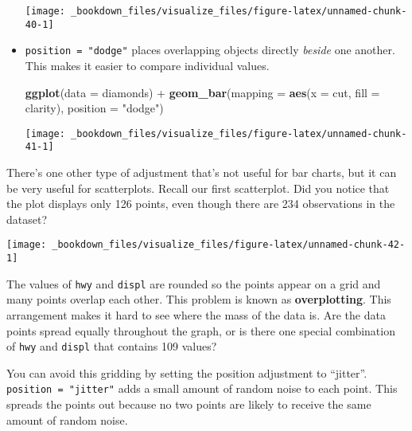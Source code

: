 \documentclass[]{book}
\newenvironment{Shaded}{\begin{snugshade}}{\end{snugshade}}
\newcommand{\KeywordTok}[1]{\textcolor[rgb]{0.13,0.29,0.53}{\textbf{{#1}}}}
\newcommand{\DataTypeTok}[1]{\textcolor[rgb]{0.13,0.29,0.53}{{#1}}}
\newcommand{\StringTok}[1]{\textcolor[rgb]{0.31,0.60,0.02}{{#1}}}
\newcommand{\NormalTok}[1]{{#1}}
\begin{document}
\begin{itemize}
  \begin{center}\texttt{[image: \_bookdown\_files/visualize\_files/figure-latex/unnamed-chunk-40-1]} \end{center}
\item
  \texttt{position\ =\ "dodge"} places overlapping objects directly
  \emph{beside} one another. This makes it easier to compare individual
  values.

\begin{Shaded}
\begin{Highlighting}[]
\KeywordTok{ggplot}\NormalTok{(}\DataTypeTok{data =} \NormalTok{diamonds) +}\StringTok{ }
\StringTok{  }\KeywordTok{geom_bar}\NormalTok{(}\DataTypeTok{mapping =} \KeywordTok{aes}\NormalTok{(}\DataTypeTok{x =} \NormalTok{cut, }\DataTypeTok{fill =} \NormalTok{clarity), }\DataTypeTok{position =} \StringTok{"dodge"}\NormalTok{)}
\end{Highlighting}
\end{Shaded}

  \begin{center}\texttt{[image: \_bookdown\_files/visualize\_files/figure-latex/unnamed-chunk-41-1]} \end{center}
\end{itemize}

There's one other type of adjustment that's not useful for bar charts,
but it can be very useful for scatterplots. Recall our first
scatterplot. Did you notice that the plot displays only 126 points, even
though there are 234 observations in the dataset?

\begin{center}\texttt{[image: \_bookdown\_files/visualize\_files/figure-latex/unnamed-chunk-42-1]} \end{center}

The values of \texttt{hwy} and \texttt{displ} are rounded so the points
appear on a grid and many points overlap each other. This problem is
known as \textbf{overplotting}. This arrangement makes it hard to see
where the mass of the data is. Are the data points spread equally
throughout the graph, or is there one special combination of
\texttt{hwy} and \texttt{displ} that contains 109 values?

You can avoid this gridding by setting the position adjustment to
``jitter''. \texttt{position\ =\ "jitter"} adds a small amount of random
noise to each point. This spreads the points out because no two points
are likely to receive the same amount of random noise.
\end{document}
